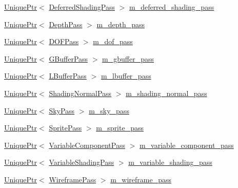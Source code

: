 \begin{DoxyCompactItemize}
\item 
\hyperlink{namespacemage_a3316d7143a973e37adf1110f2e80ca31}{Unique\+Ptr}$<$ \hyperlink{classmage_1_1_deferred_shading_pass}{Deferred\+Shading\+Pass} $>$ \hyperlink{classmage_1_1_renderer_a0179c9a4fe8b2c6d090a96adc94383b0}{m\+\_\+deferred\+\_\+shading\+\_\+pass}
\item 
\hyperlink{namespacemage_a3316d7143a973e37adf1110f2e80ca31}{Unique\+Ptr}$<$ \hyperlink{classmage_1_1_depth_pass}{Depth\+Pass} $>$ \hyperlink{classmage_1_1_renderer_a8c0dc117b4df9685e9e049175e5a91a6}{m\+\_\+depth\+\_\+pass}
\item 
\hyperlink{namespacemage_a3316d7143a973e37adf1110f2e80ca31}{Unique\+Ptr}$<$ \hyperlink{classmage_1_1_d_o_f_pass}{D\+O\+F\+Pass} $>$ \hyperlink{classmage_1_1_renderer_aa0c9add6ebb5bf1ace9592c6041bf5a8}{m\+\_\+dof\+\_\+pass}
\item 
\hyperlink{namespacemage_a3316d7143a973e37adf1110f2e80ca31}{Unique\+Ptr}$<$ \hyperlink{classmage_1_1_g_buffer_pass}{G\+Buffer\+Pass} $>$ \hyperlink{classmage_1_1_renderer_a7f36e74990c2c32d7fa26cdc00f86009}{m\+\_\+gbuffer\+\_\+pass}
\item 
\hyperlink{namespacemage_a3316d7143a973e37adf1110f2e80ca31}{Unique\+Ptr}$<$ \hyperlink{structmage_1_1_l_buffer_pass}{L\+Buffer\+Pass} $>$ \hyperlink{classmage_1_1_renderer_a7f60c763f2636bd1ea608b69a5924996}{m\+\_\+lbuffer\+\_\+pass}
\item 
\hyperlink{namespacemage_a3316d7143a973e37adf1110f2e80ca31}{Unique\+Ptr}$<$ \hyperlink{classmage_1_1_shading_normal_pass}{Shading\+Normal\+Pass} $>$ \hyperlink{classmage_1_1_renderer_a1867f2dd151f3180b8efebba5b018fc8}{m\+\_\+shading\+\_\+normal\+\_\+pass}
\item 
\hyperlink{namespacemage_a3316d7143a973e37adf1110f2e80ca31}{Unique\+Ptr}$<$ \hyperlink{classmage_1_1_sky_pass}{Sky\+Pass} $>$ \hyperlink{classmage_1_1_renderer_a7e9d76a3294d0a5b2d99a5335ff0cd04}{m\+\_\+sky\+\_\+pass}
\item 
\hyperlink{namespacemage_a3316d7143a973e37adf1110f2e80ca31}{Unique\+Ptr}$<$ \hyperlink{classmage_1_1_sprite_pass}{Sprite\+Pass} $>$ \hyperlink{classmage_1_1_renderer_ae6850abe92b8d03f3eefbfb34fe9e5d8}{m\+\_\+sprite\+\_\+pass}
\item 
\hyperlink{namespacemage_a3316d7143a973e37adf1110f2e80ca31}{Unique\+Ptr}$<$ \hyperlink{classmage_1_1_variable_component_pass}{Variable\+Component\+Pass} $>$ \hyperlink{classmage_1_1_renderer_a6016e73941650d3b88ef9ab9873548a6}{m\+\_\+variable\+\_\+component\+\_\+pass}
\item 
\hyperlink{namespacemage_a3316d7143a973e37adf1110f2e80ca31}{Unique\+Ptr}$<$ \hyperlink{classmage_1_1_variable_shading_pass}{Variable\+Shading\+Pass} $>$ \hyperlink{classmage_1_1_renderer_adb0d48e33a86c3ee481b26165e416487}{m\+\_\+variable\+\_\+shading\+\_\+pass}
\item 
\hyperlink{namespacemage_a3316d7143a973e37adf1110f2e80ca31}{Unique\+Ptr}$<$ \hyperlink{classmage_1_1_wireframe_pass}{Wireframe\+Pass} $>$ \hyperlink{classmage_1_1_renderer_a8c9f28228031337e26725af8213268ed}{m\+\_\+wireframe\+\_\+pass}
\end{DoxyCompactItemize}


